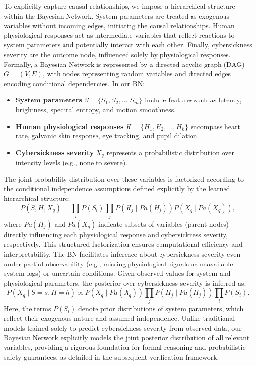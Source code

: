 \documentclass{vgtc}                          %
\begin{document}
To explicitly capture causal relationships, we impose a hierarchical structure within the Bayesian Network. System parameters are treated as exogenous variables without incoming edges, initiating the causal relationships. Human physiological responses act as intermediate variables that reflect reactions to system parameters and potentially interact with each other. Finally, cybersickness severity are the outcome node, influenced solely by physiological responses.  Formally, a Bayesian Network is represented by a directed acyclic graph (DAG) \(G = (V, E)\), with nodes representing random variables and directed edges encoding conditional dependencies. In our BN:
\begin{itemize}
    \item \textbf{System parameters} \(S = \{ S_1, S_2, \dots, S_m \}\) include features such as latency, brightness, spectral entropy, and motion smoothness.
    \item \textbf{Human physiological responses} \(H = \{ H_1, H_2, \dots, H_k \}\) encompass heart rate, galvanic skin response, eye tracking, and pupil dilation.
    \item \textbf{Cybersickness severity} \(X_q\) represents a probabilistic distribution over intensity levels (e.g., none to severe).
\end{itemize}
The joint probability distribution over these variables is factorized according to the conditional independence assumptions defined explicitly by the learned hierarchical structure:
\begin{equation}\label{eq-BN}
    P(S,H,X_q) = \prod_{i}P(S_i) \prod_{j}P(H_j \mid Pa(H_j)) P(X_q \mid Pa(X_q)),
\end{equation}
where \(Pa(H_j)\) and \(Pa(X_q)\) indicate subsets of variables (parent nodes) directly influencing each physiological response and cybersickness severity, respectively. This structured factorization ensures computational efficiency and interpretability.
The BN facilitates inference about cybersickness severity even under partial observability (e.g., missing physiological signals or unavailable system logs) or uncertain conditions. Given observed values for system and physiological parameters, the posterior over cybersickness severity is inferred as:
\[
    P(X_q \mid S = s, H = h) \propto P(X_q \mid Pa(X_q)) \prod_{j}P(H_j \mid Pa(H_j)) \prod_{i}P(S_i).
\]
Here, the terms $P(S_i)$ denote prior distributions of system parameters, which reflect their exogenous nature and assumed independence. Unlike traditional models trained solely to predict cybersickness severity from observed data, our Bayesian Network explicitly models the joint posterior distribution of all relevant variables, providing a rigorous foundation for formal reasoning and probabilistic safety guarantees, as detailed in the subsequent verification framework.
\end{document}
